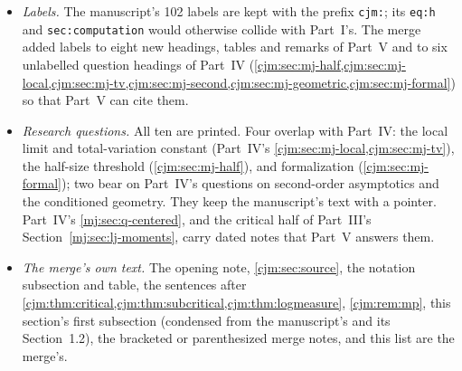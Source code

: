\documentclass[11pt,a4paper]{article}
\theoremstyle{definition}\newaliascnt{definition}{theorem}
\theoremstyle{remark}\newaliascnt{remark}{theorem}
\newcommand{\Cat}{\mathcal C}
\newcommand{\ljP}{\mathbb P}
\newcommand{\ljE}{\mathbb E}
\newcommand{\cjmic}{c_{\mathrm{mic}}}
\newcommand{\cjmac}{c_{\mathrm{mac}}}
\newcommand{\cjLeb}{\mathrm{Leb}}
\begin{document}
\begin{itemize}
 $\mathcal K(p)\to\mathfrak m(p)$, $h\to\cjmic$, $j\to\cjmac$,
 $a\to\mathfrak a$ (the tail coefficient; the block sizes $a$, $b$ keep
 their letters), $A_0=a/2\to\frac3{2\sqrt\pi}$ (written out),
 $\Phi\to\mathcal M$, $T_n\to\vartheta_n$, $Q_n^\lambda\to
 \ljP_n^\lambda,\ljE_n^\lambda$, $\mu_\lambda\to\varpi_\lambda$,
 $m\to\cjLeb$, $S,S_n,S_Y\to\mathcal S,\mathcal S_n,\mathcal S_Y$,
 $r(x)\to\varrho(x)$, $b\to\mathfrak b$, $H,J,J_n\to\mathcal H,\mathcal
 J,\mathcal J_n$, $\mathcal A,\mathcal A(p)\to\mathcal R,\mathcal R(p)$,
 $c(p)\to\mathfrak c(p)$, the compact set $K\to\mathcal D$, the constants
 $C,C_K\to K,K_{\mathcal D}$, $P=\sup|p|\to p^\ast$, $L=\log n$ (written
 out), $\psi\to\varphi_\lambda$ in the proof of \cref{cjm:cor:tilt} (the
 manuscript's $\psi$ is also the digamma function),
 $F(u)\to\mathcal F(u)$ in the proof of \cref{cjm:lem:j},
 $C(x)\to\Cat(x)$, $h(n,u)\to\mathcal N_n(u)$, $A_j\to\mathcal G_j$,
 $c_k(u)\to c_{k,u}$, $T_m(n,u,v)\to T^{(m)}_{u,v}(n)$; the macros
 $\mathbb E,\mathbb P,d_{\mathrm{TV}},\mathcal L$ are Part~III's. No
 normalization changed.
\item \emph{Labels.} The manuscript's 102 labels are kept with the prefix
 \texttt{cjm:}; its \texttt{eq:h} and \texttt{sec:computation} would
 otherwise collide with Part~I's. The merge added labels to eight new
 headings, tables and remarks of Part~V and to six unlabelled question
 headings of Part~IV (\cref{cjm:sec:mj-half,cjm:sec:mj-local,cjm:sec:mj-tv,cjm:sec:mj-second,cjm:sec:mj-geometric,cjm:sec:mj-formal})
 so that Part~V can cite them.
\item \emph{Research questions.} All ten are printed. Four overlap with
 Part~IV: the local limit and total-variation constant (Part~IV's
 \cref{cjm:sec:mj-local,cjm:sec:mj-tv}), the half-size threshold
 (\cref{cjm:sec:mj-half}), and formalization (\cref{cjm:sec:mj-formal});
 two bear on Part~IV's questions on second-order asymptotics and the
 conditioned geometry. They keep the manuscript's text with a pointer.
 Part~IV's \cref{mj:sec:q-centered}, and the critical half of Part~III's
 Section~\ref{mj:sec:lj-moments}, carry dated notes that Part~V answers
 them.
\item \emph{The merge's own text.} The opening note, \cref{cjm:sec:source},
 the notation subsection and table, the sentences after
 \cref{cjm:thm:critical,cjm:thm:subcritical,cjm:thm:logmeasure},
 \cref{cjm:rem:mp}, this section's first subsection (condensed from the
 manuscript's  and its Section~1.2),
 the bracketed or parenthesized merge notes, and this list are the merge's.

\end{itemize}
\end{document}
